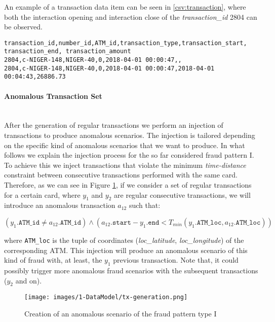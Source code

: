 An example of a transaction data item can be seen in \ref{csv:transaction}, where both the 
interaction opening and interaction close of the \emph{transaction\_id} 2804 can be observed.
\begin{center}
\lstset{style=csvStyle}
\begin{lstlisting}[caption={Example of transaction-all.csv}, label={csv:transaction}]
transaction_id,number_id,ATM_id,transaction_type,transaction_start,
transaction_end, transaction_amount
2804,c-NIGER-148,NIGER-40,0,2018-04-01 00:00:47,,
2804,c-NIGER-148,NIGER-40,0,2018-04-01 00:00:47,2018-04-01 00:04:43,26886.73
\end{lstlisting}
\end{center}

\paragraph{Anomalous Transaction Set\\\\}

After the generation of regular transactions we perform an injection of transactions to produce anomalous scenarios. The injection is tailored depending on the specific kind of 
anomalous scenarios that we want to produce. In what follows we explain the injection process for the so far considered fraud pattern I.\\

To achieve this we inject transactions that violate the minimum \emph{time-distance} constraint between consecutive transactions performed with the same card. Therefore, as we can see in Figure \ref{img:anomalous-type-1}, if we consider a set of regular transactions for a certain card, where $y_1$ and $y_2$ are regular consecutive transactions, we will introduce an anomalous transaction $a_{12}$ such that: 

$$(y_1.\texttt{ATM\_id} \ne a_{12}.\texttt{ATM\_id}) \land (a_{12}.\texttt{start} - 
y_1.\texttt{end} < T_{min}(y_1.\texttt{ATM\_loc}, a_{12}.\texttt{ATM\_loc}))$$

where \texttt{ATM\_loc} is the tuple of coordinates (\emph{loc\_latitude}, \emph{loc\_longitude}) of the corresponding ATM. This injection will produce an anomalous scenario of this kind of fraud with, at least, the $y_1$ previous transaction. Note that, it could possibly trigger more anomalous fraud scenarios with the subsequent transactions ($y_2$ and on).

\begin{figure}[H]
    \centering
    \texttt{[image: images/1-DataModel/tx-generation.png]}
    \caption{Creation of an anomalous scenario of the fraud pattern type I}
    \label{img:anomalous-type-1}
\end{figure}

